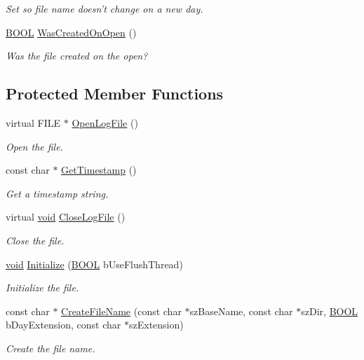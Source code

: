 \begin{DoxyCompactItemize}
\begin{DoxyCompactList}\small\item\em \-Set so file name doesn't change on a new day. \end{DoxyCompactList}\item 
\hyperlink{_cpclient_8h_a3be13892ae7076009afcf121347dd319}{\-B\-O\-O\-L} \hyperlink{class_c_logging_a9fce71e7994c1d5c28c6157422f31d93}{\-Was\-Created\-On\-Open} ()
\begin{DoxyCompactList}\small\item\em \-Was the file created on the open? \end{DoxyCompactList}\end{DoxyCompactItemize}
\subsection*{\-Protected \-Member \-Functions}
\begin{DoxyCompactItemize}
\item 
virtual \-F\-I\-L\-E $\ast$ \hyperlink{class_c_logging_a0d8e6a8b67dbbbe3e404cdda9f3322c9}{\-Open\-Log\-File} ()
\begin{DoxyCompactList}\small\item\em \-Open the file. \end{DoxyCompactList}\item 
const char $\ast$ \hyperlink{class_c_logging_a795d8dbe3547b536cfb26ef9260d39cf}{\-Get\-Timestamp} ()
\begin{DoxyCompactList}\small\item\em \-Get a timestamp string. \end{DoxyCompactList}\item 
virtual \hyperlink{_cpclient_8h_a6464f7480a0fd0ee170cba12b2c0497f}{void} \hyperlink{class_c_logging_a0614e12273115a14378429f0196166bc}{\-Close\-Log\-File} ()
\begin{DoxyCompactList}\small\item\em \-Close the file. \end{DoxyCompactList}\item 
\hyperlink{_cpclient_8h_a6464f7480a0fd0ee170cba12b2c0497f}{void} \hyperlink{class_c_logging_a67e61e01aee29074030278a798c17bf4}{\-Initialize} (\hyperlink{_cpclient_8h_a3be13892ae7076009afcf121347dd319}{\-B\-O\-O\-L} b\-Use\-Flush\-Thread)
\begin{DoxyCompactList}\small\item\em \-Initialize the file. \end{DoxyCompactList}\item 
const char $\ast$ \hyperlink{class_c_logging_a4e92f2bbc3b615dcae1325533962f652}{\-Create\-File\-Name} (const char $\ast$sz\-Base\-Name, const char $\ast$sz\-Dir, \hyperlink{_cpclient_8h_a3be13892ae7076009afcf121347dd319}{\-B\-O\-O\-L} b\-Day\-Extension, const char $\ast$sz\-Extension)
\begin{DoxyCompactList}\small\item\em \-Create the file name. \end{DoxyCompactList}\end{DoxyCompactItemize}

